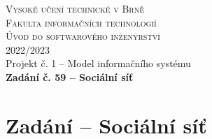 \documentclass{article}
\begin{document}
\graphicspath{{ fig/ }}
\thispagestyle{fancy}

\begin{center}
    \textsc{ \huge{Vysoké učení technické v Brně} } \\ [0.5cm]
    \textsc{ \huge{Fakulta informačních technologií} } \\ [5cm]
    \textsc{ \huge{Úvod do softwarového inženýrství} } \\ [0.5cm]
    \textsc{ \huge{2022/2023} } \\ [3cm]
    \huge{Projekt č. 1 -- Model informačního systému} \\ [2cm]
    \textbf{ \huge{Zadání č. 59 -- Sociální síť} }
\end{center}


\fancyhf{} %
\renewcommand{\headrulewidth}{0pt}


\restoregeometry
\newpage

\tableofcontents
\listoffigures

\newpage

\section{Zadání -- Sociální síť}
\end{document}

